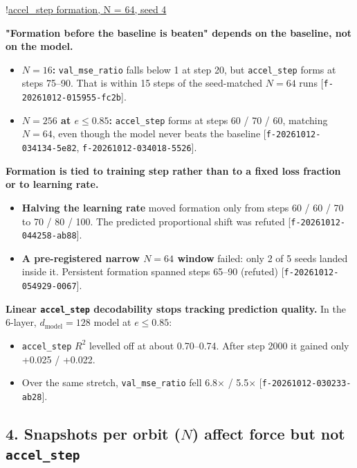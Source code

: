 \documentclass{article}
\begin{document}
!\href{figure:formation/run-20261011-202258-3cf9}{accel\_step formation, N = 64, seed 4}

\textbf{"Formation before the baseline is beaten" depends on the baseline, not on the model.}

\begin{itemize}
\item \textbf{$N = 16$:} \texttt{val\_mse\_ratio} falls below 1 at step 20, but \texttt{accel\_step} forms at steps 75–90. That is within 15 steps of the seed-matched $N = 64$ runs [\texttt{f-20261012-015955-fc2b}].
\item \textbf{$N = 256$ at $e \le 0.85$:} \texttt{accel\_step} forms at steps 60 / 70 / 60, matching $N = 64$, even though the model never beats the baseline [\texttt{f-20261012-034134-5e82}, \texttt{f-20261012-034018-5526}].
\end{itemize}

\textbf{Formation is tied to training step rather than to a fixed loss fraction or to learning rate.}

\begin{itemize}
\item \textbf{Halving the learning rate} moved formation only from steps 60 / 60 / 70 to 70 / 80 / 100. The predicted proportional shift was refuted [\texttt{f-20261012-044258-ab88}].
\item \textbf{A pre-registered narrow $N = 64$ window} failed: only 2 of 5 seeds landed inside it. Persistent formation spanned steps 65–90 (refuted) [\texttt{f-20261012-054929-0067}].
\end{itemize}

\textbf{Linear \texttt{accel\_step} decodability stops tracking prediction quality.} In the 6-layer, $d_{\text{model}} = 128$ model at $e \le 0.85$:

\begin{itemize}
\item \texttt{accel\_step} $R^2$ levelled off at about 0.70–0.74. After step 2000 it gained only +0.025 / +0.022.
\item Over the same stretch, \texttt{val\_mse\_ratio} fell 6.8× / 5.5× [\texttt{f-20261012-030233-ab28}].
\end{itemize}

\subsection{4. Snapshots per orbit ($N$) affect force but not \texttt{accel\_step}}
\end{document}

